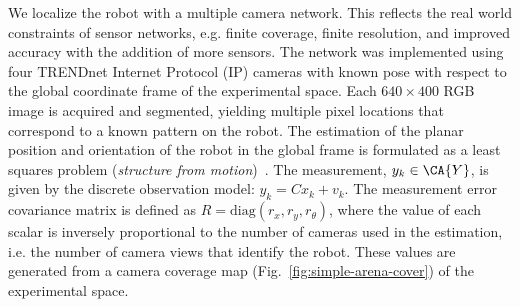 
We localize the robot with a multiple camera network. 
This reflects the real world constraints of sensor networks, e.g. finite coverage, finite resolution, and improved accuracy with the addition of more sensors. 
The network was implemented using four TRENDnet Internet Protocol (IP) cameras with known pose with respect to the global coordinate frame of the experimental space. 
Each $640\times400$ RGB image is acquired and segmented, yielding multiple pixel locations that correspond to a known pattern on the robot. 
The estimation of the planar position and orientation of the robot in the global frame is formulated as a least squares problem
({\em structure from motion})~\cite{YM-SS-JK-SSS:04}.
The measurement, $y_k \in \CA{Y}$, is given by the discrete observation model:
$y_k = Cx_k+v_k$.
The measurement error covariance matrix is defined as $R = \mathrm{diag}(r_x,r_y,r_{\theta})$, where the value of each scalar is inversely proportional to the number of cameras used in the estimation, i.e. the number of camera views that identify the robot. These values are generated from a camera coverage map (Fig.~\ref{fig:simple-arena-cover}) of the experimental space.  



